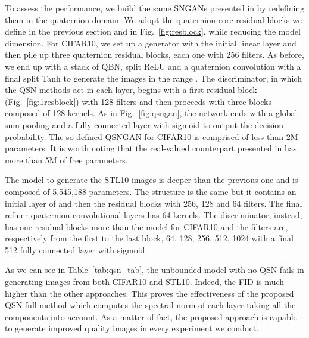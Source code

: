 \documentclass[graybox]{svmult}
\begin{document}
To assess the performance, we build the same SNGANs presented in \cite{Miyato2018SpectralNF} by redefining them in the quaternion domain. We adopt the quaternion core residual blocks we define in the previous section and in Fig.~\ref{fig:resblock}, while reducing the model dimension. For CIFAR10, we set up a generator with the initial linear layer  and then pile up three quaternion residual blocks, each one with 256 filters. As before, we end up with a stack of QBN, split ReLU and a quaternion convolution with a final split Tanh to generate the  images in the range . The discriminator, in which the QSN methods act in each layer, begins with a first residual block (Fig.~\ref{fig:1resblock}) with 128 filters and then proceeds with three blocks composed of 128 kernels. As in Fig.~\ref{fig:qsngan}, the network ends with a global sum pooling and a fully connected layer with sigmoid to output the decision probability. The so-defined QSNGAN for CIFAR10 is comprised of less than 2M parameters. It is worth noting that the real-valued counterpart presented in \cite{Miyato2018SpectralNF} has more than 5M of free parameters.

The model to generate the  STL10 images is deeper than the previous one and is composed of 5,545,188 parameters. The structure is the same but it contains an initial layer of  and then the residual blocks with 256, 128 and 64 filters. The final refiner quaternion convolutional layers has 64 kernels. The discriminator, instead, has one residual blocks more than the model for CIFAR10 and the filters are, respectively from the first to the last block, 64, 128, 256, 512, 1024 with a final 512 fully connected layer with sigmoid.

As we can see in Table~\ref{tab:qsn_tab}, the unbounded model with no QSN fails in generating images from both CIFAR10 and STL10. Indeed, the FID is much higher than the other approaches. This proves the effectiveness of the proposed QSN full method which computes the spectral norm of each layer taking all the components into account. As a matter of fact, the proposed approach is capable to generate improved quality images in every experiment we conduct.
\end{document}
